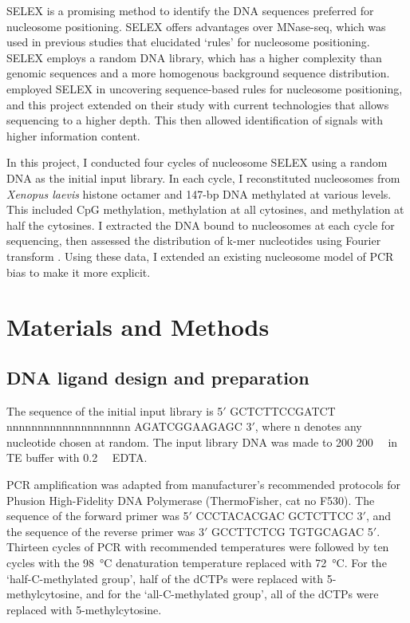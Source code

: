 \documentclass[parskip=full, numbers=noenddot]{scrreprt}
\begin{document}
SELEX is a promising method to identify the DNA sequences preferred for nucleosome positioning.  SELEX offers advantages over MNase-seq, which was used in previous studies that elucidated `rules' for nucleosome positioning.  SELEX employs a random DNA library, which has a higher complexity than genomic sequences and a more homogenous background sequence distribution.  \citet{lowary_new_1998} employed SELEX in uncovering sequence-based rules for nucleosome positioning, and this project extended on their study with current technologies that allows sequencing to a higher depth.  This then allowed identification of signals with higher information content.


In this project, I conducted four cycles of nucleosome SELEX using a random DNA as the initial input library.  In each cycle, I reconstituted nucleosomes from \emph{Xenopus laevis} histone octamer and 147-bp DNA \citep{dyer_reconstitution_2003} methylated at various levels.  This included CpG methylation, methylation at all cytosines, and methylation at half the cytosines.  I extracted the DNA bound to nucleosomes at each cycle for sequencing, then assessed the distribution of k-mer nucleotides using Fourier transform \citep{lowary_new_1998, zhu_interaction_2018}.  Using these data, I extended an existing nucleosome model of PCR bias to make it more explicit.

\section{Materials and Methods}
\label{sec:emsaselex_methods}

\subsection{DNA ligand design and preparation}
\label{ssec:emsaselex_methods_lig}

The sequence of the initial input library is 5$'$ GCTCTTCCGATCT nnnnnnnnnnnnnnnnnnnn AGATCGGAAGAGC 3$'$, where n denotes any nucleotide chosen at random. The input library DNA was made to 200 \SI{200}{\nano\Molar} in TE buffer with \SI{0.2}{\milli\Molar} EDTA.

PCR amplification was adapted from manufacturer's recommended protocols for Phusion High-Fidelity DNA Polymerase (ThermoFisher, cat no F530).  The sequence of the forward primer was 5$'$ CCCTACACGAC GCTCTTCC 3$'$, and the sequence of the reverse primer was 3$'$ GCCTTCTCG TGTGCAGAC 5$'$.  Thirteen cycles of PCR with recommended temperatures were followed by ten cycles with the \SI{98}{\celsius} denaturation temperature replaced with \SI{72}{\celsius}.  For the `half-C-methylated group', half of the dCTPs were replaced with 5-methylcytosine, and for the `all-C-methylated group', all of the dCTPs were replaced with 5-methylcytosine.
\end{document}
